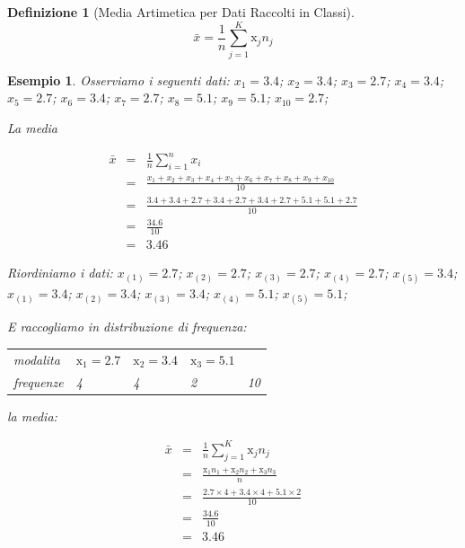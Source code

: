 \documentclass[
  11pt,
]{book}
\theoremstyle{mytheoremstyle}
\theoremstyle{mydefstyle}
\newtheorem{definition}{Definizione}[section]
\newtheorem{example}{{Esempio}}[section]
\begin{document}
\begin{info}

\begin{definition}[Media Artimetica per Dati Raccolti in Classi]
\[
\bar x =\frac 1 n \sum_{j=1}^K\mathrm{x}_j n_j 
\]
\end{definition}

\end{info}

\begin{example}
Osserviamo i seguenti dati:
\(x_{1}=3.4\); \(x_{2}=3.4\); \(x_{3}=2.7\); \(x_{4}=3.4\); \(x_{5}=2.7\); \(x_{6}=3.4\); \(x_{7}=2.7\); \(x_{8}=5.1\); \(x_{9}=5.1\); \(x_{10}=2.7\);

La media

\begin{eqnarray*}
\bar x &=&\frac 1 n \sum_{i=1}^nx_i \\
   &=& \frac{x_{1}+x_{2}+x_{3}+x_{4}+x_{5}+x_{6}+x_{7}+x_{8}+x_{9}+x_{10}} {10} \\
         &=& \frac{3.4+3.4+2.7+3.4+2.7+3.4+2.7+5.1+5.1+2.7}  {10} \\
         &=& \frac{34.6}  {10}\\
         &=& 3.46
\end{eqnarray*}

Riordiniamo i dati:
\(x_{(1)}=2.7\); \(x_{(2)}=2.7\); \(x_{(3)}=2.7\); \(x_{(4)}=2.7\); \(x_{(5)}=3.4\); \(x_{(1)}=3.4\); \(x_{(2)}=3.4\); \(x_{(3)}=3.4\); \(x_{(4)}=5.1\); \(x_{(5)}=5.1\);

E raccogliamo in distribuzione di frequenza:

\begin{tabular}{llll|>{}l}
\toprule
modalita & $\mathrm{x}_1=2.7$ & $\mathrm{x}_2=3.4$ & $\mathrm{x}_3=5.1$ & \\
frequenze & 4 & 4 & 2 & 10\\
\bottomrule
\end{tabular}

la media:

\begin{eqnarray*}
  \bar x &=&\frac 1 n \sum_{j=1}^K\mathrm{x}_j n_j \\
  &=& \frac{\mathrm{x}_1 n_1+\mathrm{x}_2 n_2+\mathrm{x}_3 n_3} n \\
         &=& \frac{2.7\times 4+3.4\times 4+5.1\times 2} {10} \\
         &=& \frac{34.6} {10} \\
         &=& 3.46
\end{eqnarray*}
\end{example}
\end{document}
